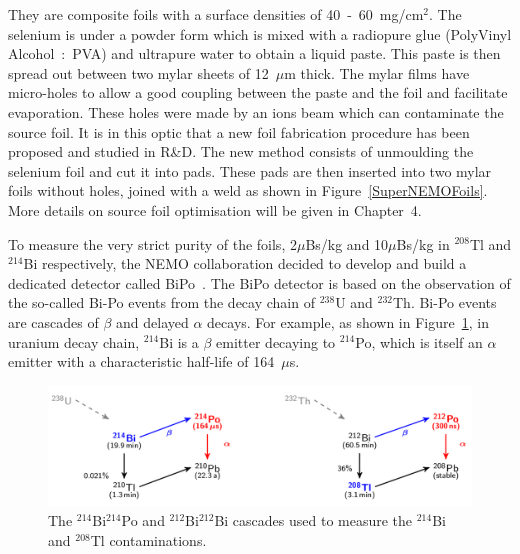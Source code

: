 \documentclass[main.tex]{subfiles}
\begin{document}
\NI They are composite foils with a surface densities of 40~-~60~mg/cm$^\text{2}$. The selenium is under a powder form which is mixed with a radiopure glue (PolyVinyl Alcohol~:~PVA) and ultrapure water to obtain a liquid paste. This paste is then spread out between two mylar sheets of 12~$\mu$m thick. The mylar films have micro-holes to allow a good coupling between the paste and the foil and facilitate evaporation. These holes were made by an ions beam which can contaminate the source foil. It is in this optic that a new foil fabrication procedure has been proposed and studied in R\&D. The new method consists of unmoulding the selenium foil and cut it into pads. These pads are then inserted into two mylar foils without holes, joined with a weld as shown in Figure~\ref{SuperNEMOFoils}. More details on source foil optimisation will be given in Chapter~4.


\bigskip


\NI To measure the very strict purity of the foils, 2$\mu$Bs/kg and 10$\mu$Bs/kg in $^{\text{208}}$Tl and $^{\text{214}}$Bi respectively, the NEMO collaboration decided to develop and build a dedicated detector called BiPo~\cite{BiPoDetector}. The BiPo detector is based on the observation of the so-called Bi-Po events from the decay chain of $^{\text{238}}$U and $^{\text{232}}$Th. Bi-Po events are cascades of $\beta$ and delayed $\alpha$ decays. For example, as shown in Figure~\ref{BiPoDecayChain}, in uranium decay chain, $^{\text{214}}$Bi is a $\beta$ emitter decaying to $^{\text{214}}$Po, which is itself an $\alpha$ emitter with a characteristic half-life of 164~$\mu$s.


\begin{figure}[h!]
\begin{center}
\includegraphics[scale=0.33]{pictures/Chap3/BiPoDecayChain.png}
\caption{The $^{\text{214}}$Bi$^{\text{214}}$Po and $^{\text{212}}$Bi$^{\text{212}}$Bi cascades used to measure the $^{\text{214}}$Bi and $^{\text{208}}$Tl contaminations.}
\label{BiPoDecayChain}
\end{center}
\end{figure}
\end{document}
